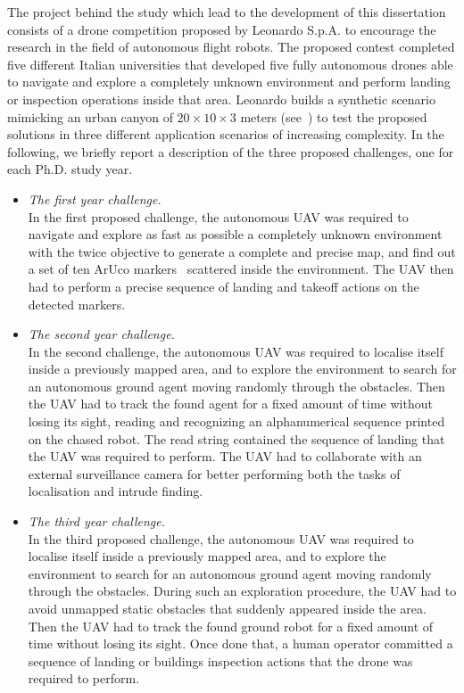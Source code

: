 The project behind the study which lead to the development of this dissertation consists of a drone competition
proposed by Leonardo S.p.A. to encourage the research in the field of autonomous flight robots.
The proposed contest completed five different Italian universities that developed five fully autonomous drones able to navigate
and explore a completely unknown environment and perform landing or inspection operations inside that area.
Leonardo builds a synthetic scenario mimicking an urban canyon of $20 \times 10 \times 3$ meters (see~)
to test the proposed solutions in three different application scenarios of increasing complexity. In the following,
we briefly report a description of the three proposed challenges, one for each Ph.D. study year.
\begin{itemize}
    \item[] \emph{The first year challenge.}\\
    In the first proposed challenge, the autonomous UAV was required to navigate and explore as fast as possible a completely unknown
    environment with the twice objective to generate a complete and precise map, and find out a set of ten ArUco markers~\cite{garrido2014automatic}
    scattered inside the environment. The UAV then had to perform a precise sequence of landing and takeoff actions on the detected markers.
    \item[] \emph{The second year challenge.}\\
    In the second challenge, the autonomous UAV was required to localise itself inside a previously mapped area, and to explore the
    environment to search for an autonomous ground agent moving randomly through the obstacles. Then the UAV had to track the found
    agent for a fixed amount of time without losing its sight, reading and recognizing an alphanumerical sequence printed on the chased robot.
    The read string contained the sequence of landing that the UAV was required to perform.
    The UAV had to collaborate with an external surveillance camera for better performing both the tasks of localisation and intrude finding.
    \item[] \emph{The third year challenge.}\\
    In the third proposed challenge, the autonomous UAV was required to localise itself inside a previously mapped area,
    and to explore the environment to search for an autonomous ground agent moving randomly through the obstacles.
    During such an exploration procedure, the UAV had to avoid unmapped static obstacles that suddenly appeared inside the area.
    Then the UAV had to track the found ground robot for a fixed amount of time without losing its sight.
    Once done that, a human operator committed a sequence of landing or buildings inspection actions that the drone was required to perform.
\end{itemize}
